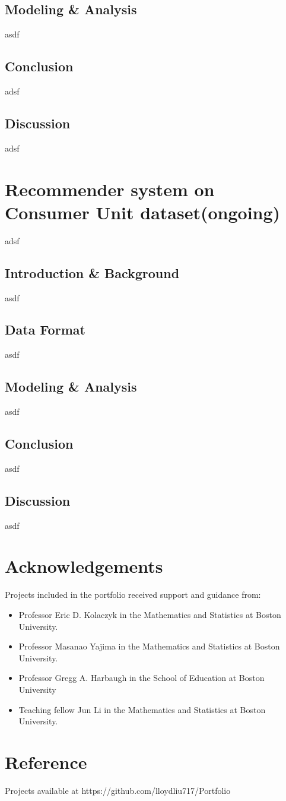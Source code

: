 \documentclass{article}
\begin{document}
	\subsection{Modeling \& Analysis}
	asdf
	\subsection{Conclusion}
	adsf
	\subsection{Discussion}
	adsf
	
	\section{Recommender system on Consumer Unit dataset(ongoing)}
	adsf
	\subsection{Introduction \& Background}
	asdf
	\subsection{Data Format}
	asdf
	\subsection{Modeling \& Analysis}
	asdf
	\subsection{Conclusion}
	asdf
	\subsection{Discussion}
	asdf
	
	\section{Acknowledgements}
	Projects included in the portfolio received support and guidance from:
	\begin{itemize}
		\item Professor Eric D. Kolaczyk in the Mathematics and Statistics at Boston University.
		\item Professor Masanao Yajima in the Mathematics and Statistics at Boston University.
		\item Professor Gregg A. Harbaugh in the School of Education at Boston University
		\item Teaching fellow Jun Li in the Mathematics and Statistics at Boston University.
	\end{itemize}
	\section{Reference}
	Projects available at https://github.com/lloydliu717/Portfolio
\end{document}
